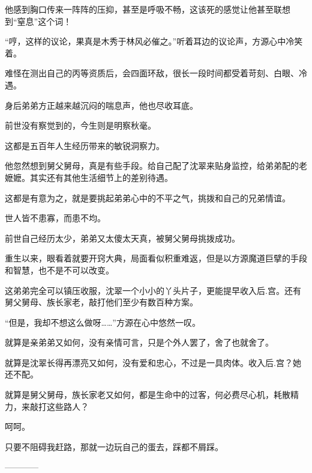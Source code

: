 \begin{this_body}
他感到胸口传来一阵阵的压抑，甚至是呼吸不畅，这该死的感觉让他甚至联想到“窒息”这个词！

“哼，这样的议论，果真是木秀于林风必催之。”听着耳边的议论声，方源心中冷笑着。

难怪在测出自己的丙等资质后，会四面环敌，很长一段时间都受着苛刻、白眼、冷遇。

身后弟弟方正越来越沉闷的喘息声，他也尽收耳底。

前世没有察觉到的，今生则是明察秋毫。

这都是五百年人生经历带来的敏锐洞察力。

他忽然想到舅父舅母，真是有些手段。给自己配了沈翠来贴身监控，给弟弟配的老嬷嬷。其实还有其他生活细节上的差别待遇。

这都是有意为之，就是要挑起弟弟心中的不平之气，挑拨和自己的兄弟情谊。

世人皆不患寡，而患不均。

前世自己经历太少，弟弟又太傻太天真，被舅父舅母挑拨成功。

重生以来，眼看着就要开窍大典，局面看似积重难返，但是以方源魔道巨擘的手段和智慧，也不是不可以改变。

这弟弟完全可以镇压收服，沈翠一个小小的丫头片子，更能提早收入后.宫。还有舅父舅母、族长家老，敲打他们至少有数百种方案。

“但是，我却不想这么做呀……”方源在心中悠然一叹。

就算是亲弟弟又如何，没有亲情可言，只是个外人罢了，舍了也就舍了。

就算是沈翠长得再漂亮又如何，没有爱和忠心，不过是一具肉体。收入后.宫？她还不配。

就算是舅父舅母，族长家老又如何，都是生命中的过客，何必费尽心机，耗散精力，来敲打这些路人？

呵呵。

只要不阻碍我赶路，那就一边玩自己的蛋去，踩都不屑踩。

------------

\end{this_body}


